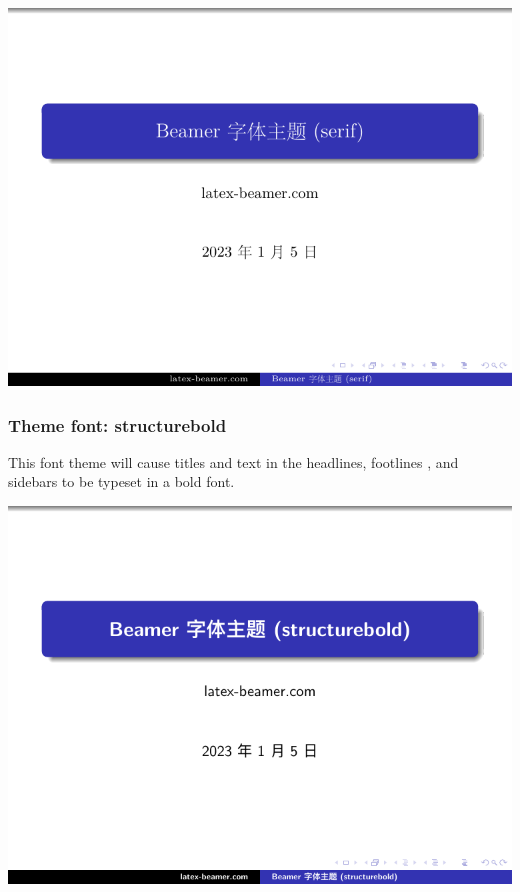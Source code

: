 \includegraphics[page=2]{examples/beamer/font-theme-serif.pdf}

\subsubsection{Theme font: {\ttfamily structurebold}}

This font theme will cause titles and text in the headlines, footlines , and sidebars to be typeset in a bold font.

\includegraphics[page=1]{examples/beamer/font-theme-structurebold.pdf}

